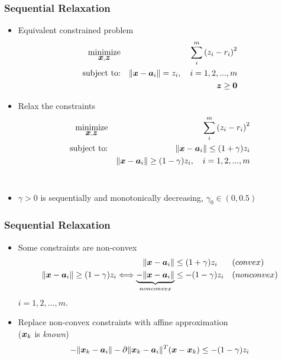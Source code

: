 \documentclass [t] {beamer} %
\begin{document}
\begin{frame} %
\frametitle{Sequential Relaxation}
\begin{itemize}
\item
Equivalent constrained problem
\begin{eqnarray} 
\nonumber
\mathop{\mbox{minimize}}_{\mbox{\boldmath$x$}, \mbox{\boldmath$z$}}& &\sum^m_i \left( z_i - r_i \right)^2 \\
\nonumber
\mbox{subject to:}& &\|\mbox{\boldmath$x$} - \mbox{\boldmath$a$}_i\| = z_i, \quad i = 1, 2, ..., m \\
\nonumber
& &\mbox{\boldmath$z$} \geq \mbox{\boldmath${0}$}
\end{eqnarray}
\item
Relax the constraints
\begin{eqnarray}
 \nonumber
\mathop{\mbox{minimize}}_{\mbox{\boldmath$x$}, \mbox{\boldmath$z$}}& &\sum^m_i \left( z_i - r_i \right)^2 \\
\nonumber
\mbox{subject to:}& &\|\mbox{\boldmath$x$} - \mbox{\boldmath$a$}_i\| \leq (1+ \gamma)z_i  \\
\nonumber
& &\|\mbox{\boldmath$x$} - \mbox{\boldmath$a$}_i\| \geq (1 - \gamma)z_i, \quad i = 1, 2, ..., m
\end{eqnarray}
\\
\item
$\gamma > 0$ is sequentially and monotonically decreasing, $\gamma_0 \in (0, 0.5)$
\end{itemize}
\end{frame}

\begin{frame} %
\frametitle{Sequential Relaxation}
\phantom{m}
\begin{itemize}
\item
Some constraints are non-convex
\begin{eqnarray} 
\nonumber
\begin{aligned}
\|\mbox{\boldmath$x$} - \mbox{\boldmath$a$}_i\| & \leq (1 + \gamma)z_i & {} & (convex)
\\ 
\|\mbox{\boldmath$x$} - \mbox{\boldmath$a$}_i\| \geq (1 - \gamma)z_i  \Longleftrightarrow \underbrace{-\|\mbox{\boldmath$x$} - \mbox{\boldmath$a$}_i\|}_{nonconvex} & \leq -(1 - \gamma)z_i & {} &(nonconvex)
\end{aligned}
\end{eqnarray} 
$i = 1, 2, \ldots, m$.
\item
Replace non-convex constraints with affine approximation 
\\
($\mbox{\boldmath$x$}_k$ is \textit{known})
\begin{equation}
\nonumber
-\|\mbox{\boldmath$x$}_k - \mbox{\boldmath$a$}_i\| - \partial\|\mbox{\boldmath$x$}_k - \mbox{\boldmath$a$}_i\|^T(\mbox{\boldmath$x$} - \mbox{\boldmath$x$}_k) \leq -(1 - \gamma)z_i
\end{equation}
\end{itemize}
\end{frame}
\end{document}
